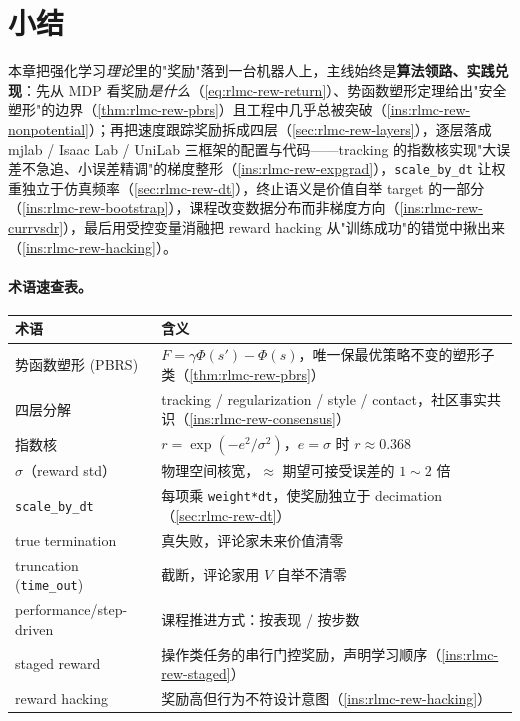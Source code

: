 \section{小结}
\label{sec:rlmc-rew-summary}

本章把强化学习\emph{理论}里的"奖励"落到一台机器人上，主线始终是\textbf{算法领路、实践兑现}：先从 MDP 看奖励\emph{是什么}（\cref{eq:rlmc-rew-return}）、势函数塑形定理给出"安全塑形"的边界（\cref{thm:rlmc-rew-pbrs}）且工程中几乎总被突破（\cref{ins:rlmc-rew-nonpotential}）；再把速度跟踪奖励拆成四层（\cref{sec:rlmc-rew-layers}），逐层落成 mjlab / Isaac Lab / UniLab 三框架的配置与代码——tracking 的指数核实现"大误差不急追、小误差精调"的梯度整形（\cref{ins:rlmc-rew-expgrad}），\verb|scale_by_dt| 让权重独立于仿真频率（\cref{sec:rlmc-rew-dt}），终止语义是价值自举 target 的一部分（\cref{ins:rlmc-rew-bootstrap}），课程改变数据分布而非梯度方向（\cref{ins:rlmc-rew-currvsdr}），最后用受控变量消融把 reward hacking 从"训练成功"的错觉中揪出来（\cref{ins:rlmc-rew-hacking}）。

\paragraph{术语速查表。}
\begin{center}
\small
\begin{tabular}{@{}ll@{}}
\toprule
术语 & 含义 \\
\midrule
势函数塑形 (PBRS) & $F=\gamma\Phi(s')-\Phi(s)$，唯一保最优策略不变的塑形子类（\cref{thm:rlmc-rew-pbrs}） \\
四层分解 & tracking / regularization / style / contact，社区事实共识（\cref{ins:rlmc-rew-consensus}） \\
指数核 & $r=\exp(-e^2/\sigma^2)$，$e=\sigma$ 时 $r\approx0.368$ \\
$\sigma$（reward std） & 物理空间核宽，$\approx$ 期望可接受误差的 $1\!\sim\!2$ 倍 \\
\verb|scale_by_dt| & 每项乘 \verb|weight*dt|，使奖励独立于 decimation（\cref{sec:rlmc-rew-dt}） \\
true termination & 真失败，评论家未来价值清零 \\
truncation (\verb|time_out|) & 截断，评论家用 $V$ 自举不清零 \\
performance/step-driven & 课程推进方式：按表现 / 按步数 \\
staged reward & 操作类任务的串行门控奖励，声明学习顺序（\cref{ins:rlmc-rew-staged}） \\
reward hacking & 奖励高但行为不符设计意图（\cref{ins:rlmc-rew-hacking}） \\
\bottomrule
\end{tabular}
\end{center}

